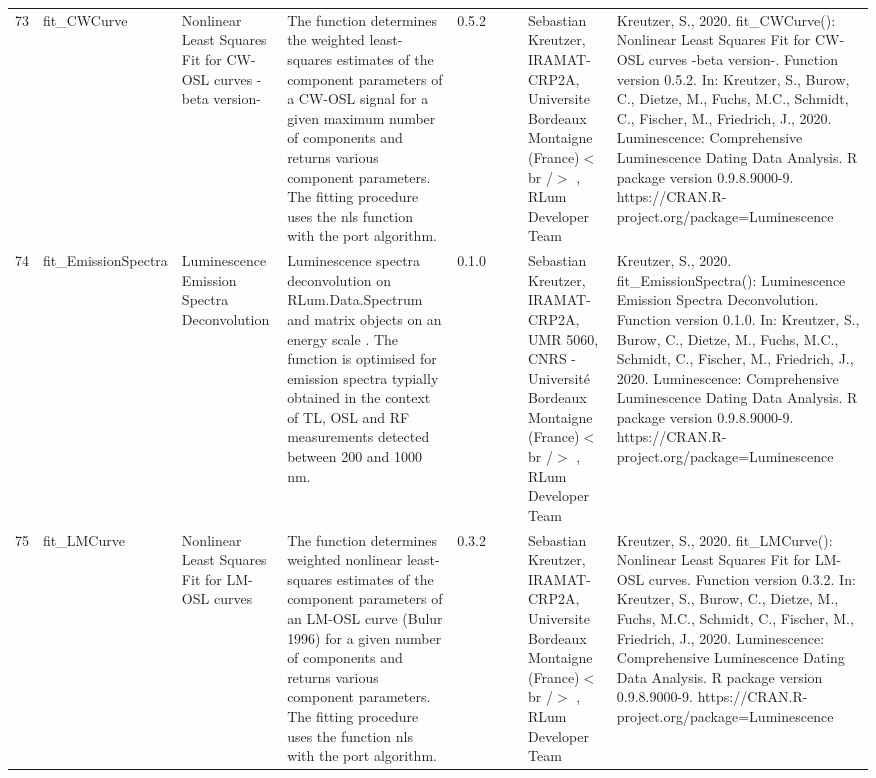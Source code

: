 \begin{table}[ht]
\begin{tabular}{rllllllll}
 \\ 
  73 & fit\_CWCurve & Nonlinear Least Squares Fit for CW-OSL curves -beta version- & The function determines the weighted least-squares estimates of the component parameters of a CW-OSL signal for a given maximum number of components and returns various component parameters. The fitting procedure uses the  nls  function with the  port  algorithm. & 0.5.2
 &  &  & Sebastian Kreutzer, IRAMAT-CRP2A, Universite Bordeaux Montaigne (France)$<$br /$>$ , RLum Developer Team & Kreutzer, S., 2020. fit\_CWCurve(): Nonlinear Least Squares Fit for CW-OSL curves -beta version-. Function version 0.5.2. In: Kreutzer, S., Burow, C., Dietze, M., Fuchs, M.C., Schmidt, C., Fischer, M., Friedrich, J., 2020. Luminescence: Comprehensive Luminescence Dating Data Analysis. R package version 0.9.8.9000-9. https://CRAN.R-project.org/package=Luminescence
 \\ 
  74 & fit\_EmissionSpectra & Luminescence Emission Spectra Deconvolution & Luminescence spectra deconvolution on  RLum.Data.Spectrum  and  matrix  objects on an  energy scale . The function is optimised for emission spectra typially obtained in the context of TL, OSL and RF measurements detected between 200 and 1000 nm. & 0.1.0
 &  &  & Sebastian Kreutzer, IRAMAT-CRP2A, UMR 5060, CNRS - Université Bordeaux Montaigne (France)$<$br /$>$ , RLum Developer Team & Kreutzer, S., 2020. fit\_EmissionSpectra(): Luminescence Emission Spectra Deconvolution. Function version 0.1.0. In: Kreutzer, S., Burow, C., Dietze, M., Fuchs, M.C., Schmidt, C., Fischer, M., Friedrich, J., 2020. Luminescence: Comprehensive Luminescence Dating Data Analysis. R package version 0.9.8.9000-9. https://CRAN.R-project.org/package=Luminescence
 \\ 
  75 & fit\_LMCurve & Nonlinear Least Squares Fit for LM-OSL curves & The function determines weighted nonlinear least-squares estimates of the component parameters of an LM-OSL curve (Bulur 1996) for a given number of components and returns various component parameters. The fitting procedure uses the function  nls  with the  port  algorithm. & 0.3.2
 &  &  & Sebastian Kreutzer, IRAMAT-CRP2A, Universite Bordeaux Montaigne (France)$<$br /$>$ , RLum Developer Team & Kreutzer, S., 2020. fit\_LMCurve(): Nonlinear Least Squares Fit for LM-OSL curves. Function version 0.3.2. In: Kreutzer, S., Burow, C., Dietze, M., Fuchs, M.C., Schmidt, C., Fischer, M., Friedrich, J., 2020. Luminescence: Comprehensive Luminescence Dating Data Analysis. R package version 0.9.8.9000-9. https://CRAN.R-project.org/package=Luminescence

\end{tabular}
\end{table}

